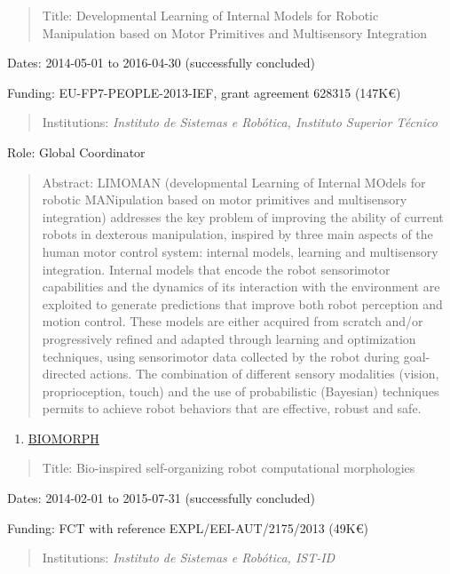 \begin{quote}
Title: Developmental Learning of Internal Models for Robotic
Manipulation based on Motor Primitives and Multisensory Integration
\end{quote}

Dates: 2014-05-01 to 2016-04-30 (successfully concluded)

Funding: EU-FP7-PEOPLE-2013-IEF, grant agreement 628315 (147K€)

\begin{quote}
Institutions: \emph{Instituto de Sistemas e Robótica, Instituto Superior
Técnico}
\end{quote}

Role: Global Coordinator

\begin{quote}
Abstract: LIMOMAN (developmental Learning of Internal MOdels for robotic
MANipulation based on motor primitives and multisensory integration)
addresses the key problem of improving the ability of current robots in
dexterous manipulation, inspired by three main aspects of the human
motor control system: internal models, learning and multisensory
integration. Internal models that encode the robot sensorimotor
capabilities and the dynamics of its interaction with the environment
are exploited to generate predictions that improve both robot perception
and motion control. These models are either acquired from scratch and/or
progressively refined and adapted through learning and optimization
techniques, using sensorimotor data collected by the robot during
goal-directed actions. The combination of different sensory modalities
(vision, proprioception, touch) and the use of probabilistic (Bayesian)
techniques permits to achieve robot behaviors that are effective, robust
and safe.
\end{quote}

\begin{enumerate}
\def\labelenumi{\arabic{enumi}.}
\setcounter{enumi}{5}
\item
  \ul{BIOMORPH}
\end{enumerate}

\begin{quote}
Title: Bio-inspired self-organizing robot computational morphologies
\end{quote}

Dates: 2014-02-01 to 2015-07-31 (successfully concluded)

Funding: FCT with reference EXPL/EEI-AUT/2175/2013 (49K€)

\begin{quote}
Institutions: \emph{Instituto de Sistemas e Robótica, IST-ID}
\end{quote}

